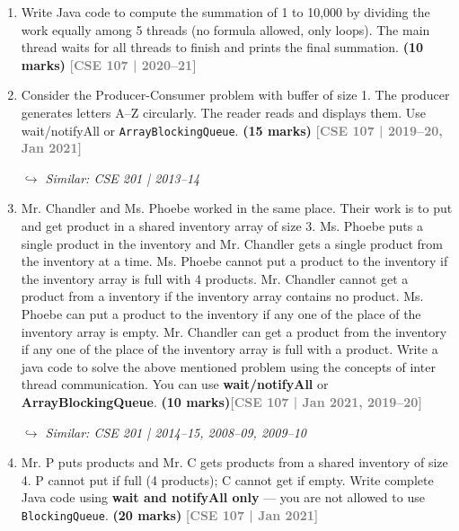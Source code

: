 \documentclass[12pt,a3paper]{article}
\newcommand{\yr}[1]{\hfill\textcolor{gray}{\small\textbf{[#1]}}}
\newcommand{\mk}[1]{\textcolor{orange!70!black}{\small\textbf{(#1 marks)}}}
\newcommand{\variant}[1]{\par\vspace{1pt}\textcolor{blue!50!black}%
  {\footnotesize\textit{$\hookrightarrow$ Similar: #1}}}
\begin{document}
\begin{enumerate}
\item Write Java code to compute the summation of 1 to 10{,}000 by dividing the work equally among 5 threads (no formula allowed, only loops). The main thread waits for all threads to finish and prints the final summation. \mk{10}
\yr{CSE 107 | 2020--21}




\item Consider the Producer-Consumer problem with buffer of size 1. The producer generates letters A--Z circularly. The reader reads and displays them. Use wait/notifyAll or \texttt{ArrayBlockingQueue}. \mk{15}
\yr{CSE 107 | 2019--20, Jan 2021}
\variant{CSE 201 | 2013--14}




\item Mr. Chandler and Ms. Phoebe worked in the same place. Their work is to put and get
product in a shared inventory array of size 3. Ms. Phoebe puts a single product in the
inventory and Mr. Chandler gets a single product from the inventory at a time. Ms.
Phoebe cannot put a product to the inventory if the inventory array is full with 4
products. Mr. Chandler cannot get a product from a inventory if the inventory array
contains no product. Ms. Phoebe can put a product to the inventory if any one of the
place of the inventory array is empty. Mr. Chandler can get a product from the inventory
if any one of the place of the inventory array is full with a product. Write a java code to
solve the above mentioned problem using the concepts of inter thread communication.
You can use \textbf{wait/notifyAll} or \textbf{ArrayBlockingQueue}. \mk{10}\yr{CSE 107 | Jan 2021, 2019--20}
\variant{CSE 201 | 2014--15, 2008--09, 2009--10}





\item Mr. P puts products and Mr. C gets products from a shared inventory of size 4. P cannot put if full (4 products); C cannot get if empty. Write complete Java code using \textbf{wait and notifyAll only} --- you are not allowed to use \texttt{BlockingQueue}. \mk{20}
\yr{CSE 107 | Jan 2021}





\end{enumerate}
\end{document}

